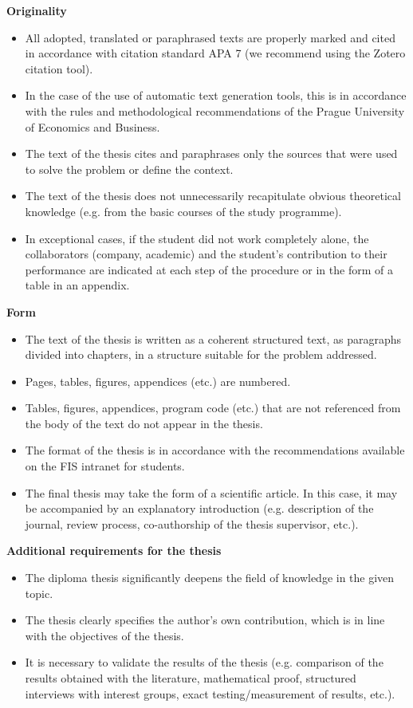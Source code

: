 {\bfseries\sffamily\Large Originality}
\begin{itemize}
\item \vspace*{-2ex}All adopted, translated or paraphrased texts are properly marked and cited in accordance with citation standard APA 7 (we recommend using the Zotero citation tool).
\item In the case of the use of automatic text generation tools, this is in accordance with the rules and methodological recommendations of the Prague University of Economics and Business.
\item The text of the thesis cites and paraphrases only the sources that were used to solve the problem or define the context.
\item The text of the thesis does not unnecessarily recapitulate obvious theoretical knowledge (e.g. from the basic courses of the study programme).
\item In exceptional cases, if the student did not work completely alone, the collaborators (company, academic) and the student's contribution to their performance are indicated at each step of the procedure or in the form of a table in an appendix.
\end{itemize}

{\bfseries\sffamily\Large Form}
\begin{itemize}
\item \vspace*{-2ex}The text of the thesis is written as a coherent structured text, as paragraphs divided into chapters, in a structure suitable for the problem addressed.
\item Pages, tables, figures, appendices (etc.) are numbered.
\item Tables, figures, appendices, program code (etc.) that are not referenced from the body of the text do not appear in the thesis.
\item The format of the thesis is in accordance with the recommendations available on the FIS intranet for students.
\item The final thesis may take the form of a scientific article. In this case, it may be accompanied by an explanatory introduction (e.g. description of the journal, review process, co-authorship of the thesis supervisor, etc.).
\end{itemize}

{\bfseries\sffamily\Large Additional requirements for the thesis}
\begin{itemize}
\item \vspace*{-2ex}The diploma thesis significantly deepens the field of knowledge in the given topic.
\item The thesis clearly specifies the author's own contribution, which is in line with the objectives of the thesis. 
\item It is necessary to validate the results of the thesis (e.g. comparison of the results obtained with the literature, mathematical proof, structured interviews with interest groups, exact testing/measurement of results, etc.).
\end{itemize}


